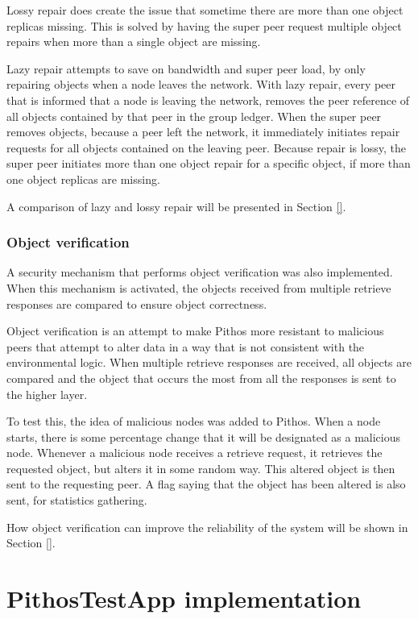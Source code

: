 Lossy repair does create the issue that sometime there are more than one object replicas missing. This is solved by having the super peer request multiple object repairs when more than a single object are missing.

Lazy repair attempts to save on bandwidth and super peer load, by only repairing objects when a node leaves the network. With lazy repair, every peer that is informed that a node is leaving the network, removes the peer reference of all objects contained by that peer in the group ledger. When the super peer removes objects, because a peer left the network, it immediately initiates repair requests for all objects contained on the leaving peer. Because repair is lossy, the super peer initiates more than one object repair for a specific object, if more than one object replicas are missing.

A comparison of lazy and lossy repair will be presented in Section \ref{}.

    \subsubsection{Object verification}
    \label{object_verification_implementation}

A security mechanism that performs object verification was also implemented. When this mechanism is activated, the objects received from multiple retrieve responses are compared to ensure object correctness.

Object verification is an attempt to make Pithos more resistant to malicious peers that attempt to alter data in a way that is not consistent with the environmental logic. When multiple retrieve responses are received, all objects are compared and the object that occurs the most from all the responses is sent to the higher layer.

To test this, the idea of malicious nodes was added to Pithos. When a node starts, there is some percentage change that it will be designated as a malicious node. Whenever a malicious node receives a retrieve request, it retrieves the requested object, but alters it in some random way. This altered object is then sent to the requesting peer. A flag saying that the object has been altered is also sent, for statistics gathering.

How object verification can improve the reliability of the system will be shown in Section \ref{}.

\section{PithosTestApp implementation}
\label{pithostestapp}

